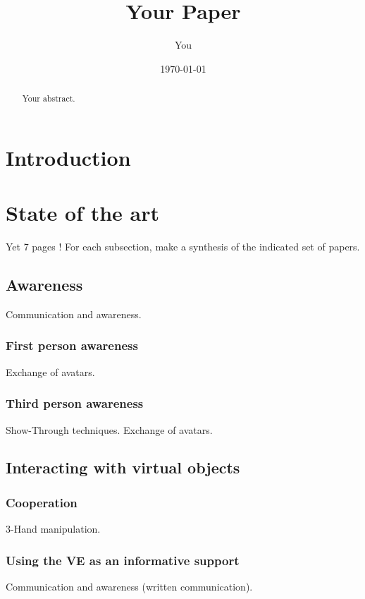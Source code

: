 \documentclass[a4paper]{article}
\title{Your Paper}
\author{You}
\date{\today}
\begin{document}
\maketitle

\begin{abstract}
Your abstract.
\end{abstract}

\tableofcontents

\section{Introduction}

\section{State of the art}
Yet 7 pages !
For each subsection, make a synthesis of the indicated set of papers.

\subsection{Awareness}
Communication and awareness.

\subsubsection{First person awareness}
Exchange of avatars.

\subsubsection{Third person awareness}
Show-Through techniques.
Exchange of avatars.

\subsection{Interacting with virtual objects}

\subsubsection{Cooperation}
3-Hand manipulation.

\subsubsection{Using the VE as an informative support}
Communication and awareness (written communication).
\end{document}
